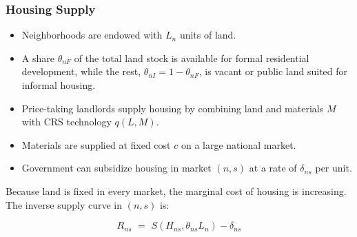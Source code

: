 \documentclass[aspectratio=149]{beamer}
\begin{document}

\begin{frame}
\frametitle{Housing Supply}

\begin{itemize}
  \item Neighborhoods are endowed with $L_n$ units of land.
  \item A share $\theta_{nF}$ of the total land stock is available for formal residential development, while the rest, $\theta_{nI} = 1-\theta_{nF}$, is vacant or public land suited for informal housing.
  \item Price-taking landlords supply housing by combining land and materials $M$ with CRS technology $q(L,M)$.
  \item Materials are supplied at fixed cost $c$ on a large national market.
  \item Government can subsidize housing in market $(n,s)$ at a rate of $\delta_{ns}$ per unit.
\end{itemize}

Because land is fixed in every market, the marginal cost of housing is increasing. The inverse supply curve in $(n,s)$ is:

\begin{equation*}
R_{ns} \,\, =\,\, S(H_{ns},\theta_{ns}L_n) - \delta_{ns}
\end{equation*} 

\vspace{4mm}

\end{frame}

\end{document}
